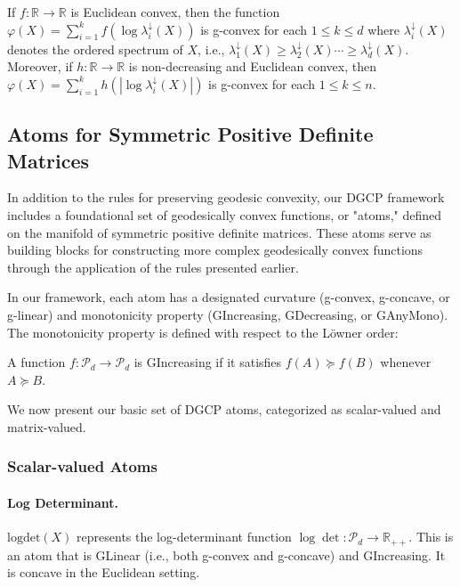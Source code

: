 \begin{theorem}
If $f: \mathbb{R} \rightarrow \mathbb{R}$ is Euclidean convex, then the function $\varphi(X) = \sum_{i=1}^k f\left(\log \lambda_i^{\downarrow}(X)\right)$ is g-convex for each $1 \leq k \leq d$ where $\lambda_i^{\downarrow}(X)$ denotes the ordered spectrum of $X$, i.e., $\lambda_1^{\downarrow}(X) \geq \lambda_2^{\downarrow}(X) \cdots \geq \lambda_d^{\downarrow}(X)$. Moreover, if $h: \mathbb{R} \rightarrow \mathbb{R}$ is non-decreasing and Euclidean convex, then $\varphi(X) = \sum_{i=1}^k h(|\log \lambda_i^{\downarrow}(X)|)$ is g-convex for each $1 \leq k \leq n$.
\end{theorem}

\subsection{Atoms for Symmetric Positive Definite Matrices}

In addition to the rules for preserving geodesic convexity, our DGCP framework includes a foundational set of geodesically convex functions, or "atoms," defined on the manifold of symmetric positive definite matrices. These atoms serve as building blocks for constructing more complex geodesically convex functions through the application of the rules presented earlier.

In our framework, each atom has a designated curvature (g-convex, g-concave, or g-linear) and monotonicity property (GIncreasing, GDecreasing, or GAnyMono). The monotonicity property is defined with respect to the Löwner order:

\begin{definition}
A function $f: \mathcal{P}_d \rightarrow \mathcal{P}_d$ is GIncreasing if it satisfies $f(A) \succeq f(B)$ whenever $A \succeq B$.
\end{definition}

We now present our basic set of DGCP atoms, categorized as scalar-valued and matrix-valued.

\subsubsection{Scalar-valued Atoms}

\paragraph{Log Determinant.} $\text{logdet}(X)$ represents the log-determinant function $\log \det: \mathcal{P}_d \rightarrow \mathbb{R}_{++}$. This is an atom that is GLinear (i.e., both g-convex and g-concave) and GIncreasing. It is concave in the Euclidean setting.

